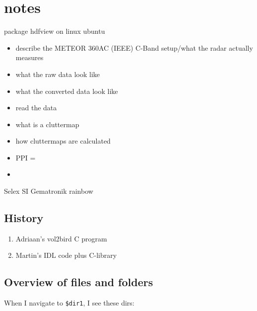 \chapter{notes}
\label{ch:notes}


package hdfview on linux ubuntu

\begin{itemize}
\item{describe the METEOR 360AC (IEEE) C-Band setup/what the radar actually measures}
\item{what the raw data look like}
\item{what the converted data look like}
\item{read the data}
\item{what is a cluttermap}
\item{how cluttermaps are calculated}
\item{PPI = }
\item{}

\end{itemize}


Selex SI
Gematronik
rainbow


\section{History}

\begin{enumerate}
\item{Adriaan's vol2bird C program}
\item{Martin's IDL code plus C-library}
\end{enumerate}


\section{Overview of files and folders}


When I navigate to \texttt{\$dir1}, I see these dirs:

